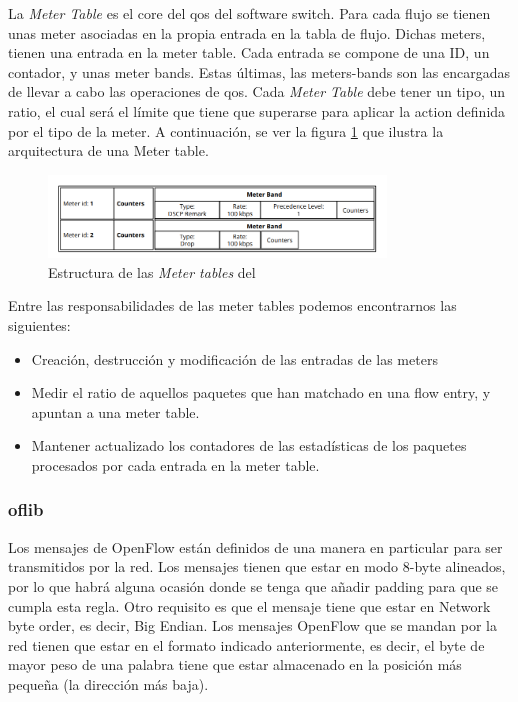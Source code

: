 La \textit{Meter Table} es el core del \gls{qos} del software switch. Para cada flujo se tienen unas meter asociadas en la propia entrada en la tabla de flujo. Dichas meters, tienen una entrada en la meter table. Cada entrada se compone de una ID, un contador, y unas meter bands. Estas últimas, las meters-bands son las encargadas de llevar a cabo las operaciones de \gls{qos}. Cada \textit{Meter Table} debe tener un tipo, un ratio, el cual será el límite que tiene que superarse para aplicar la action definida por el tipo de la meter. A continuación, se ver la figura \ref{fig:bofuss5} que ilustra la arquitectura de una Meter table.

\begin{figure}[ht]
    \centering
    \includegraphics[width=0.8\textwidth]{archivos/img/teoria/bofuss5.png}
    \caption{Estructura de las \textit{Meter tables} del  \cite{fernandes2015software}}
    \label{fig:bofuss5}
\end{figure}

Entre las responsabilidades de las meter tables podemos encontrarnos las siguientes:

\begin{itemize}
    \item Creación, destrucción y modificación de las entradas de las meters
    \item Medir el ratio de aquellos paquetes que han matchado en una flow entry, y apuntan a una meter table.
    \item Mantener actualizado los contadores de las estadísticas de los paquetes procesados por cada entrada en la meter table.
\end{itemize}

\subsubsection{oflib}

Los mensajes de OpenFlow están definidos de una manera en particular para ser transmitidos por la red. Los mensajes tienen que estar en modo 8-byte alineados, por lo que habrá alguna ocasión donde se tenga que añadir padding para que se cumpla esta regla. Otro requisito es que el mensaje tiene que estar en Network byte order, es decir, Big Endian. Los mensajes OpenFlow que se mandan por la red tienen que estar en el formato indicado anteriormente, es decir, el byte de mayor peso de una palabra tiene que estar almacenado en la posición más pequeña (la dirección más baja).

